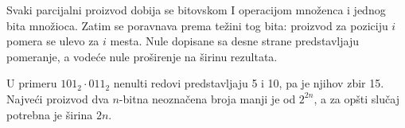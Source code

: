 Svaki parcijalni proizvod dobija se bitovskom I operacijom množenca i jednog bita množioca. Zatim se poravnava prema težini tog bita: proizvod za poziciju $i$ pomera se ulevo za $i$ mesta. Nule dopisane sa desne strane predstavljaju pomeranje, a vodeće nule proširenje na širinu rezultata.

U primeru $101_2\cdot011_2$ nenulti redovi predstavljaju 5 i 10, pa je njihov zbir 15. Najveći proizvod dva $n$-bitna neoznačena broja manji je od $2^{2n}$, a za opšti slučaj potrebna je širina $2n$.
